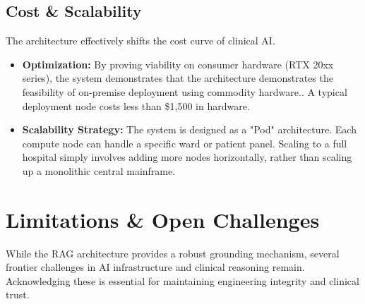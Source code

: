 \subsection{Cost \& Scalability}
The architecture effectively shifts the cost curve of clinical AI.

\begin{itemize}
    \item \textbf{Optimization:} By proving viability on consumer hardware (RTX 20xx series), the system demonstrates that the architecture demonstrates the feasibility of on-premise deployment using commodity hardware.. A typical deployment node costs less than \$1,500 in hardware.

    \item \textbf{Scalability Strategy:} The system is designed as a "Pod" architecture. Each compute node can handle a specific ward or patient panel. Scaling to a full hospital simply involves adding more nodes horizontally, rather than scaling up a monolithic central mainframe.
\end{itemize}

\section{Limitations \& Open Challenges}
\label{sec:limitations}
While the RAG architecture provides a robust grounding mechanism, several frontier challenges in AI infrastructure and clinical reasoning remain. Acknowledging these is essential for maintaining engineering integrity and clinical trust.

